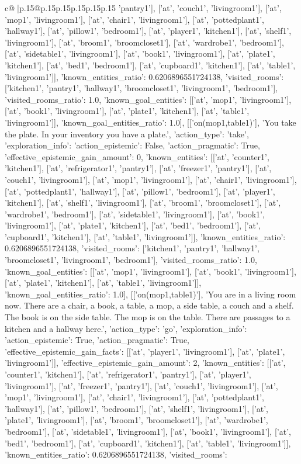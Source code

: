 \documentclass{article}
\begin{document}
{\begin{supertabular}{c@{$\;$}|p{.15\linewidth}@{}p{.15\linewidth}p{.15\linewidth}p{.15\linewidth}p{.15\linewidth}p{.15\linewidth}}
{{{'pantry1'], ['at', 'couch1', 'livingroom1'], ['at', 'mop1', 'livingroom1'], ['at', 'chair1', 'livingroom1'], ['at', 'pottedplant1', 'hallway1'], ['at', 'pillow1', 'bedroom1'], ['at', 'player1', 'kitchen1'], ['at', 'shelf1', 'livingroom1'], ['at', 'broom1', 'broomcloset1'], ['at', 'wardrobe1', 'bedroom1'], ['at', 'sidetable1', 'livingroom1'], ['at', 'book1', 'livingroom1'], ['at', 'plate1', 'kitchen1'], ['at', 'bed1', 'bedroom1'], ['at', 'cupboard1', 'kitchen1'], ['at', 'table1', 'livingroom1']], 'known_entities_ratio': 0.6206896551724138, 'visited_rooms': ['kitchen1', 'pantry1', 'hallway1', 'broomcloset1', 'livingroom1', 'bedroom1'], 'visited_rooms_ratio': 1.0, 'known_goal_entities': [['at', 'mop1', 'livingroom1'], ['at', 'book1', 'livingroom1'], ['at', 'plate1', 'kitchen1'], ['at', 'table1', 'livingroom1']], 'known_goal_entities_ratio': 1.0}}], [['on(mop1,table1)'], 'You take the plate. In your inventory you have a plate.', {'action_type': 'take', 'exploration_info': {'action_epistemic': False, 'action_pragmatic': True, 'effective_epistemic_gain_amount': 0, 'known_entities': [['at', 'counter1', 'kitchen1'], ['at', 'refrigerator1', 'pantry1'], ['at', 'freezer1', 'pantry1'], ['at', 'couch1', 'livingroom1'], ['at', 'mop1', 'livingroom1'], ['at', 'chair1', 'livingroom1'], ['at', 'pottedplant1', 'hallway1'], ['at', 'pillow1', 'bedroom1'], ['at', 'player1', 'kitchen1'], ['at', 'shelf1', 'livingroom1'], ['at', 'broom1', 'broomcloset1'], ['at', 'wardrobe1', 'bedroom1'], ['at', 'sidetable1', 'livingroom1'], ['at', 'book1', 'livingroom1'], ['at', 'plate1', 'kitchen1'], ['at', 'bed1', 'bedroom1'], ['at', 'cupboard1', 'kitchen1'], ['at', 'table1', 'livingroom1']], 'known_entities_ratio': 0.6206896551724138, 'visited_rooms': ['kitchen1', 'pantry1', 'hallway1', 'broomcloset1', 'livingroom1', 'bedroom1'], 'visited_rooms_ratio': 1.0, 'known_goal_entities': [['at', 'mop1', 'livingroom1'], ['at', 'book1', 'livingroom1'], ['at', 'plate1', 'kitchen1'], ['at', 'table1', 'livingroom1']], 'known_goal_entities_ratio': 1.0}}], [['on(mop1,table1)'], 'You are in a living room now. There are a chair, a book, a table, a mop, a side table, a couch and a shelf. The book is on the side table. The mop is on the table. There are passages to a kitchen and a hallway here.', {'action_type': 'go', 'exploration_info': {'action_epistemic': True, 'action_pragmatic': True, 'effective_epistemic_gain_facts': [['at', 'player1', 'livingroom1'], ['at', 'plate1', 'livingroom1']], 'effective_epistemic_gain_amount': 2, 'known_entities': [['at', 'counter1', 'kitchen1'], ['at', 'refrigerator1', 'pantry1'], ['at', 'player1', 'livingroom1'], ['at', 'freezer1', 'pantry1'], ['at', 'couch1', 'livingroom1'], ['at', 'mop1', 'livingroom1'], ['at', 'chair1', 'livingroom1'], ['at', 'pottedplant1', 'hallway1'], ['at', 'pillow1', 'bedroom1'], ['at', 'shelf1', 'livingroom1'], ['at', 'plate1', 'livingroom1'], ['at', 'broom1', 'broomcloset1'], ['at', 'wardrobe1', 'bedroom1'], ['at', 'sidetable1', 'livingroom1'], ['at', 'book1', 'livingroom1'], ['at', 'bed1', 'bedroom1'], ['at', 'cupboard1', 'kitchen1'], ['at', 'table1', 'livingroom1']], 'known_entities_ratio': 0.6206896551724138, 'visited_rooms': }}}
\end{supertabular}}
\end{document}
